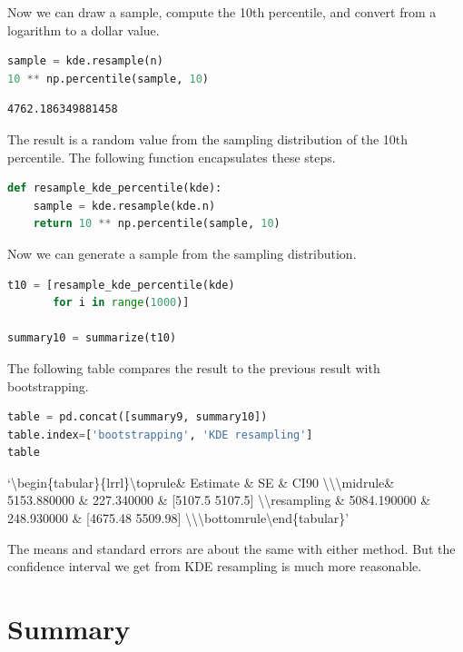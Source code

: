Now we can draw a sample, compute the 10th percentile, and convert from
a logarithm to a dollar value.

\begin{lstlisting}[language=Python,style=source]
sample = kde.resample(n)
10 ** np.percentile(sample, 10)
\end{lstlisting}

\begin{lstlisting}[style=output]
4762.186349881458
\end{lstlisting}

The result is a random value from the sampling distribution of the 10th
percentile. The following function encapsulates these steps.

\begin{lstlisting}[language=Python,style=source]
def resample_kde_percentile(kde):
    sample = kde.resample(kde.n)
    return 10 ** np.percentile(sample, 10)
\end{lstlisting}

Now we can generate a sample from the sampling distribution.

\begin{lstlisting}[language=Python,style=source]
t10 = [resample_kde_percentile(kde)
       for i in range(1000)]

summary10 = summarize(t10)
\end{lstlisting}

The following table compares the result to the previous result with
bootstrapping.

\begin{lstlisting}[language=Python,style=source]
table = pd.concat([summary9, summary10])
table.index=['bootstrapping', 'KDE resampling']
table
\end{lstlisting}

`\textbackslash begin\{tabular\}\{lrrl\}\n\textbackslash toprule\n \&
Estimate \& SE \& CI90
\textbackslash\textbackslash{}\n\textbackslash midrule\nbootstrapping \&
5153.880000 \& 227.340000 \& {[}5107.5 5107.5{]}
\textbackslash\textbackslash{}\nKDE resampling \& 5084.190000 \&
248.930000 \& {[}4675.48 5509.98{]}
\textbackslash\textbackslash{}\n\textbackslash bottomrule\n\textbackslash end\{tabular\}\n'

The means and standard errors are about the same with either method. But
the confidence interval we get from KDE resampling is much more
reasonable.

\hypertarget{summary}{%
\section{Summary}\label{summary}}


